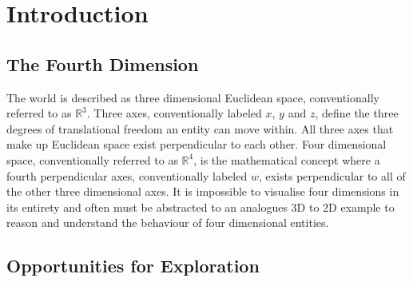 \documentclass{l4proj}
\begin{document}
\chapter{Introduction}


\section{The Fourth Dimension}

The world is described as three dimensional Euclidean space, conventionally referred to as $\mathbb{R}^3$. Three axes, conventionally labeled \(x\), \(y\) and \(z\), define the three degrees of translational freedom an entity can move within. All three axes that make up Euclidean space exist perpendicular to each other. Four dimensional space, conventionally referred to as $\mathbb{R}^4$, is the mathematical concept where a fourth perpendicular axes, conventionally labeled \(w\), exists perpendicular to all of the other three dimensional axes. It is impossible to visualise four dimensions in its entirety and often must be abstracted to an analogues 3D to 2D example to reason and understand the behaviour of four dimensional entities. 

\section{Opportunities for Exploration}
\end{document}
